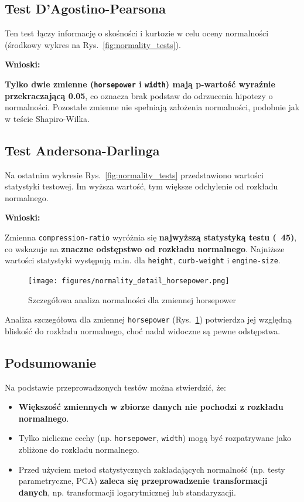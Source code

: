 \documentclass[12pt,a4paper]{article}
\begin{document}
\subsection{Test D'Agostino-Pearsona}

Ten test łączy informację o skośności i kurtozie w celu oceny normalności (środkowy wykres na Rys.~\ref{fig:normality_tests}).

\textbf{Wnioski:}

\textbf{Tylko dwie zmienne (\texttt{horsepower} i \texttt{width}) mają p-wartość wyraźnie przekraczającą 0.05}, co oznacza brak podstaw do odrzucenia hipotezy o normalności. Pozostałe zmienne nie spełniają założenia normalności, podobnie jak w teście Shapiro-Wilka.

\subsection{Test Andersona-Darlinga}

Na ostatnim wykresie Rys.~\ref{fig:normality_tests} przedstawiono wartości statystyki testowej. Im wyższa wartość, tym większe odchylenie od rozkładu normalnego.

\textbf{Wnioski:}

Zmienna \texttt{compression-ratio} wyróżnia się \textbf{najwyższą statystyką testu (~45)}, co wskazuje na \textbf{znaczne odstępstwo od rozkładu normalnego}. Najniższe wartości statystyki występują m.in. dla \texttt{height}, \texttt{curb-weight} i \texttt{engine-size}.

\begin{figure}[H]
    \centering
    \texttt{[image: figures/normality\_detail\_horsepower.png]}
    \caption{Szczegółowa analiza normalności dla zmiennej horsepower}
    \label{fig:normality_detail_horsepower}
\end{figure}

Analiza szczegółowa dla zmiennej \texttt{horsepower} (Rys.~\ref{fig:normality_detail_horsepower}) potwierdza jej względną bliskość do rozkładu normalnego, choć nadal widoczne są pewne odstępstwa.

\subsection{Podsumowanie}

Na podstawie przeprowadzonych testów można stwierdzić, że:

\begin{itemize}
    \item \textbf{Większość zmiennych w zbiorze danych nie pochodzi z rozkładu normalnego}.
    \item Tylko nieliczne cechy (np. \texttt{horsepower}, \texttt{width}) mogą być rozpatrywane jako zbliżone do rozkładu normalnego.
    \item Przed użyciem metod statystycznych zakładających normalność (np. testy parametryczne, PCA) \textbf{zaleca się przeprowadzenie transformacji danych}, np. transformacji logarytmicznej lub standaryzacji.
\end{itemize}
\end{document}

